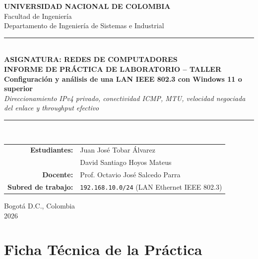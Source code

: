 \documentclass[11pt, a4paper]{article}
\begin{document}
\begin{titlepage}
    \centering
    \vspace*{0.8cm}
    {\Large \textbf{UNIVERSIDAD NACIONAL DE COLOMBIA}}\\[0.25cm]
    {\large Facultad de Ingeniería}\\
    {\large Departamento de Ingeniería de Sistemas e Industrial}\\[1.2cm]

    \textcolor{unalgreen}{\rule{\textwidth}{1.5pt}}\\[0.5cm]
    {\small \textbf{ASIGNATURA: REDES DE COMPUTADORES}}\\[0.4cm]
    {\LARGE \textbf{INFORME DE PRÁCTICA DE LABORATORIO -- TALLER}}\\[0.35cm]
    {\Large \textbf{Configuración y análisis de una LAN IEEE 802.3 con Windows 11 o superior}}\\[0.3cm]
    {\normalsize \textit{Direccionamiento IPv4 privado, conectividad ICMP, MTU, velocidad negociada del enlace y throughput efectivo}}\\[0.5cm]
    \textcolor{unalgreen}{\rule{\textwidth}{1.5pt}}\\[1.8cm]

    \begin{tabular}{rl}
        \textbf{Estudiantes:} & Juan José Tobar Álvarez \\
                              & David Santiago Hoyos Mateus \\[0.6cm]
        \textbf{Docente:}     & Prof. Octavio José Salcedo Parra \\[0.6cm]
        \textbf{Subred de trabajo:} & \texttt{192.168.10.0/24} (LAN Ethernet IEEE 802.3) \\
    \end{tabular}

    \vfill
    {\normalsize Bogotá D.C., Colombia}\\
    {\normalsize 2026}
\end{titlepage}

\section*{Ficha Técnica de la Práctica}
\end{document}
